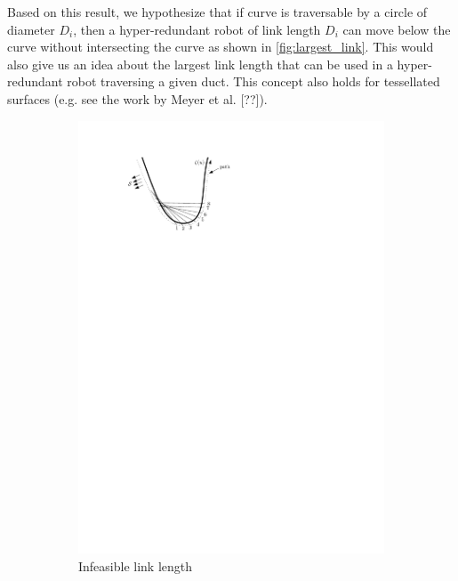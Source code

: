 \documentclass[12pt,a4]{article}
\begin{document}
Based on this result, we hypothesize that if curve is traversable by a circle of diameter $D_i$, then a hyper-redundant robot of link length $D_i$ can move below the curve without intersecting the curve as shown in \cref{fig:largest_link}. This would also give us an idea about the largest link length that can be used in a hyper-redundant robot traversing a given duct. This concept also holds for tessellated surfaces (e.g. see the work by Meyer et al. [??]). 
\begin{figure}[ht!]
	\centering
		\begin{subfigure}{0.31\textwidth}
		\centering
		\includegraphics[width=1.15\linewidth]{figures/Traversabilityproblem.pdf}
		\caption{Infeasible link length\label{fig:not_traversable}}
	\end{subfigure}%
	\begin{subfigure}{0.31\textwidth}
		\centering

\end{subfigure}
\end{figure}
\end{document}
